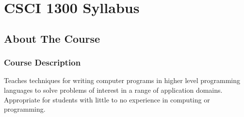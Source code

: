 \chapter*{CSCI 1300 Syllabus}

\section{About The Course}
\subsection{Course Description}

Teaches techniques for writing computer programs in higher level programming languages to solve problems of interest in a range of application domains. Appropriate for students with little to no experience in computing or programming.

